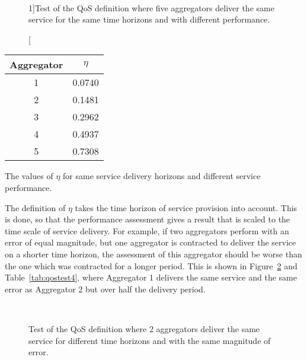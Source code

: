 \begin{figure}[htb!]
\centering
{} \\
\caption[][1\baselineskip]{Test of the QoS definition where five aggregators deliver the same service for the same time horizons and with different performance.}
\label{fig:indextest3}
\end{figure}

\begin{margintable}%
	\centering
	\begin{tabular}{cc}
		\toprule
		Aggregator & $\eta$ \\
		\midrule
		1 & 0.0740 \\
		2 & 0.1481 \\
		3 & 0.2962 \\
		4 & 0.4937 \\
		5 & 0.7308 \\
		\bottomrule
	\end{tabular}
	\caption{The values of $\eta$ for same service delivery horizons and different service performance.}
	\label{tab:qostest3}
\end{margintable}
\FloatBarrier
The definition of $\eta$ takes the time horizon of service provision into account. This is done, so that the performance assessment gives a result that is scaled to the time scale of service delivery. For example, if two aggregators perform with an error of equal magnitude, but one aggregator is contracted to deliver the service on a shorter time horizon, the assessment of this aggregator should be worse than the one which was contracted for a longer period. This is shown in Figure~\ref{fig:indextest4} and Table~\ref{tab:qostest4}, where Aggregator 1 delivers the same service and the same error as Aggregator 2 but over half the delivery period.

\begin{figure}[htb!]
\centering
{}\\
\caption{Test of the QoS definition where 2 aggregators deliver the same service for different time horizons and with the same magnitude of error.}
\label{fig:indextest4}
\end{figure}

